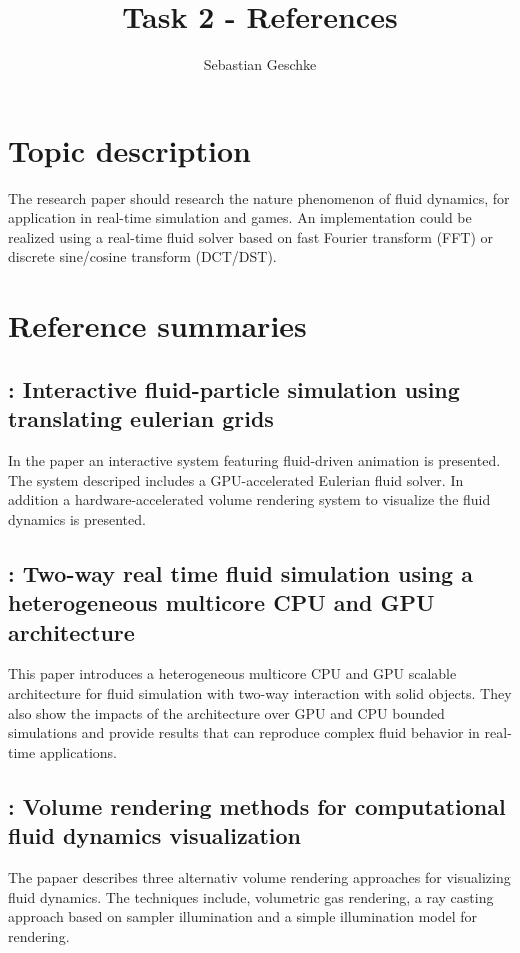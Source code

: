 \documentclass[11pt, a4paper]{article} %
\title{Task 2 - References}
\author{Sebastian Geschke}
\begin{document}
\maketitle
\section{Topic description}
The research paper should research the nature phenomenon of fluid dynamics, for application in real-time simulation and games. An implementation could be realized using a real-time fluid solver based on fast Fourier transform (FFT) or discrete sine/cosine transform (DCT/DST). 
\section{Reference summaries}

\subsection{\cite{Cohen:2010}: Interactive fluid-particle simulation using translating eulerian grids}
In the paper an interactive system featuring fluid-driven animation is presented. The system descriped includes a GPU-accelerated Eulerian fluid solver. In addition a hardware-accelerated volume rendering system to visualize the fluid dynamics is presented.

\subsection{\cite{daS.Junior:2011}: Two-way real time fluid simulation using a heterogeneous multicore CPU and GPU architecture}
This paper introduces a heterogeneous multicore CPU and GPU scalable architecture for fluid simulation with two-way interaction with solid objects. 
They also show the impacts of the architecture over GPU and CPU bounded simulations and provide results that can reproduce complex fluid behavior in real-time applications.

\subsection{\cite{Ebert:1994}: Volume rendering methods for computational fluid dynamics visualization}
The papaer describes three alternativ volume rendering approaches for visualizing fluid dynamics. The techniques include, volumetric gas rendering, a ray casting approach based on sampler illumination and a simple illumination model for rendering.
\end{document}
